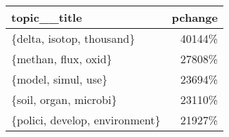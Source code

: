 \begin{tabular}{p{2cm}r}
\toprule
                   topic\_\_title &  pchange \\
\midrule
      \{delta, isotop, thousand\} &   40144\% \\
           \{methan, flux, oxid\} &   27808\% \\
            \{model, simul, use\} &   23694\% \\
         \{soil, organ, microbi\} &   23110\% \\
 \{polici, develop, environment\} &   21927\% \\
\bottomrule
\end{tabular}
